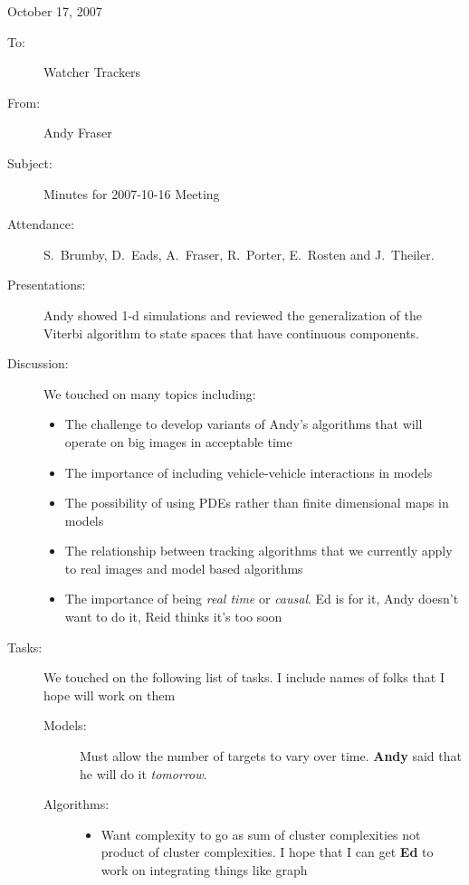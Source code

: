\documentclass{article}
\begin{document}
\noindent
\hfill October 17, 2007\\
\noindent
\begin{description}
\item[To:] Watcher Trackers
\item[From:] Andy Fraser
\item[Subject:] Minutes for 2007-10-16 Meeting
\vspace{1cm}
\end{description}

\noindent
\begin{description}
\item[Attendance:] S.~Brumby, D.~Eads, A.~Fraser, R.~Porter,
  E.~Rosten and J.~Theiler.
\item[Presentations:] Andy showed 1-d simulations and reviewed the
  generalization of the Viterbi algorithm to state spaces that have
  continuous components.
\item[Discussion:] We touched on many topics including:
  \begin{itemize}
  \item The challenge to develop variants of Andy's algorithms that
    will operate on big images in acceptable time
  \item The importance of including vehicle-vehicle interactions in models
  \item The possibility of using PDEs rather than finite dimensional
    maps in models
  \item The relationship between tracking algorithms that we currently
    apply to real images and model based algorithms
  \item The importance of being \emph{real time} or \emph{causal}. Ed
    is for it, Andy doesn't want to do it, Reid thinks it's too soon
  \end{itemize}
\item[Tasks:] We touched on the following list of tasks.  I include
  names of folks that I hope will work on them
  \begin{description}
  \item[Models:] Must allow the number of targets to vary over time.
    \textbf{Andy} said that he will do it \emph{tomorrow}.
  \item[Algorithms:]
    \begin{itemize}
    \item Want complexity to go as sum of cluster complexities not
      product of cluster complexities.  I hope that I can get
      \textbf{Ed} to work on integrating things like graph

\end{itemize}
\end{description}
\end{description}
\end{document}
